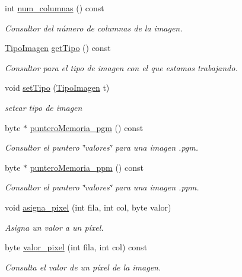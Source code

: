 \begin{DoxyCompactItemize}
int \hyperlink{classImagen_ac28d55c18064aea2a65e6fcf51d86191}{num\+\_\+columnas} () const
\begin{DoxyCompactList}\small\item\em Consultor del número de columnas de la imagen. \end{DoxyCompactList}\item 
\hyperlink{imagenES_8h_a8914f6544a484741b05c092d9e7522ed}{Tipo\+Imagen} \hyperlink{classImagen_aa48d818ac9ebfd8b466ce8d8e4d93fae}{get\+Tipo} () const
\begin{DoxyCompactList}\small\item\em Consultor para el tipo de imagen con el que estamos trabajando. \end{DoxyCompactList}\item 
void \hyperlink{classImagen_a438a466496e357a45cd16d77d21c264f}{set\+Tipo} (\hyperlink{imagenES_8h_a8914f6544a484741b05c092d9e7522ed}{Tipo\+Imagen} t)
\begin{DoxyCompactList}\small\item\em setear tipo de imagen \end{DoxyCompactList}\item 
byte $\ast$ \hyperlink{classImagen_a86cf24f7febd691382744ff38aacba0f}{puntero\+Memoria\+\_\+pgm} () const
\begin{DoxyCompactList}\small\item\em Consultor el puntero \char`\"{}valores\char`\"{} para una imagen .pgm. \end{DoxyCompactList}\item 
byte $\ast$ \hyperlink{classImagen_a53c9e3df66783fc3ef3ee43039e540b7}{puntero\+Memoria\+\_\+ppm} () const
\begin{DoxyCompactList}\small\item\em Consultor el puntero \char`\"{}valores\char`\"{} para una imagen .ppm. \end{DoxyCompactList}\item 
void \hyperlink{classImagen_af9ac39daf075288473967839d9a0d2d8}{asigna\+\_\+pixel} (int fila, int col, byte valor)
\begin{DoxyCompactList}\small\item\em Asigna un valor a un píxel. \end{DoxyCompactList}\item 
byte \hyperlink{classImagen_a7d9378695a7fd2dce8092f180e716229}{valor\+\_\+pixel} (int fila, int col) const
\begin{DoxyCompactList}\small\item\em Consulta el valor de un píxel de la imagen. \end{DoxyCompactList}\item 

\end{DoxyCompactItemize}
